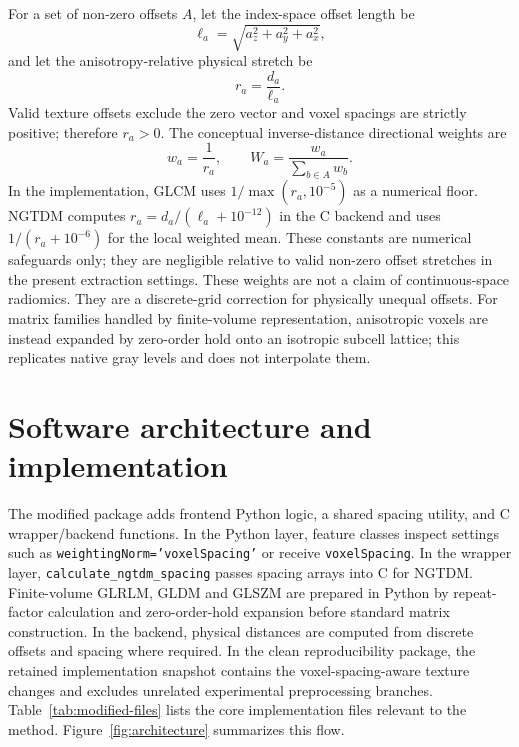 \documentclass[11pt]{article}
\begin{document}
For a set of non-zero offsets \(A\), let the index-space offset length be
\begin{equation}
\ell_a = \sqrt{a_z^2+a_y^2+a_x^2},
\end{equation}
and let the anisotropy-relative physical stretch be
\begin{equation}
r_a = \frac{d_a}{\ell_a}.
\end{equation}
Valid texture offsets exclude the zero vector and voxel spacings are strictly positive; therefore \(r_a>0\). The conceptual inverse-distance directional weights are
\begin{equation}
w_a = \frac{1}{r_a}, \qquad
W_a = \frac{w_a}{\sum_{b\in A} w_b}.
\end{equation}
In the implementation, GLCM uses \(1/\max(r_a,10^{-5})\) as a numerical floor. NGTDM computes \(r_a=d_a/(\ell_a+10^{-12})\) in the C backend and uses \(1/(r_a+10^{-6})\) for the local weighted mean. These constants are numerical safeguards only; they are negligible relative to valid non-zero offset stretches in the present extraction settings. These weights are not a claim of continuous-space radiomics. They are a discrete-grid correction for physically unequal offsets. For matrix families handled by finite-volume representation, anisotropic voxels are instead expanded by zero-order hold onto an isotropic subcell lattice; this replicates native gray levels and does not interpolate them.

\section{Software architecture and implementation}
The modified package adds frontend Python logic, a shared spacing utility, and C wrapper/backend functions. In the Python layer, feature classes inspect settings such as \texttt{weightingNorm='voxelSpacing'} or receive \texttt{voxelSpacing}. In the wrapper layer, \texttt{calculate\_ngtdm\_spacing} passes spacing arrays into C for NGTDM. Finite-volume GLRLM, GLDM and GLSZM are prepared in Python by repeat-factor calculation and zero-order-hold expansion before standard matrix construction. In the backend, physical distances are computed from discrete offsets and spacing where required. In the clean reproducibility package, the retained implementation snapshot contains the voxel-spacing-aware texture changes and excludes unrelated experimental preprocessing branches. Table~\ref{tab:modified-files} lists the core implementation files relevant to the method. Figure~\ref{fig:architecture} summarizes this flow.
\end{document}
